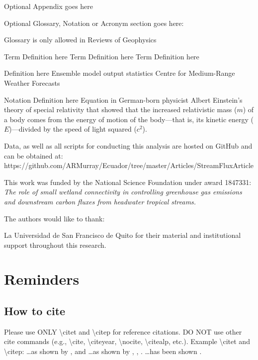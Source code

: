 \documentclass[draft,linenumbers]{agujournal2018}
\begin{document}
Optional Appendix goes here

Optional Glossary, Notation or Acronym section goes here:

Glossary is only allowed in Reviews of Geophysics

\begin{glossary}
 Term Definition here
 Term Definition here
 Term Definition here
\end{glossary}

\begin{acronyms}
 Definition here
 Ensemble model output statistics
 Centre for Medium-Range Weather Forecasts
\end{acronyms}

\begin{notation}
 Notation Definition here
Equation in German-born physicist Albert Einstein's theory of special
relativity that showed that the increased relativistic mass ($m$) of a
body comes from the energy of motion of the body—that is, its kinetic
energy ($E$)—divided by the speed of light squared ($c^2$).
\end{notation}

\acknowledgments

Data, as well as all scripts for conducting this analysis are hosted on
GitHub and can be obtained at:
https://github.com/ARMurray/Ecuador/tree/master/Articles/StreamFluxArticle

This work was funded by the National Science Foundation under award
1847331: \emph{The role of small wetland connectivity in controlling
greenhouse gas emissions and downstream carbon fluxes from headwater
tropical streams.}

The authors would like to thank:

La Universidad de San Francisco de Quito for their material and
institutional support throughout this research.

\section{Reminders}

\subsection{How to cite}

Please use ONLY \textbackslash{}citet and \textbackslash{}citep for
reference citations. DO NOT use other cite commands (e.g.,
\textbackslash{}cite, \textbackslash{}citeyear, \textbackslash{}nocite,
\textbackslash{}citealp, etc.). Example \textbackslash{}citet and
\textbackslash{}citep: \ldots{}as shown by \citet{Levitus2012},
\citet{Nuncio2011} and \citet{Raphael2004} \ldots{}as shown by
\citep{Levitus2012}, \citep{Nuncio2011}, \citep{Raphael2004}.
\ldots{}has been shown
\citep[e.g.,][]{Levitus2012, Nuncio2011, Raphael2004}.


\end{document}
